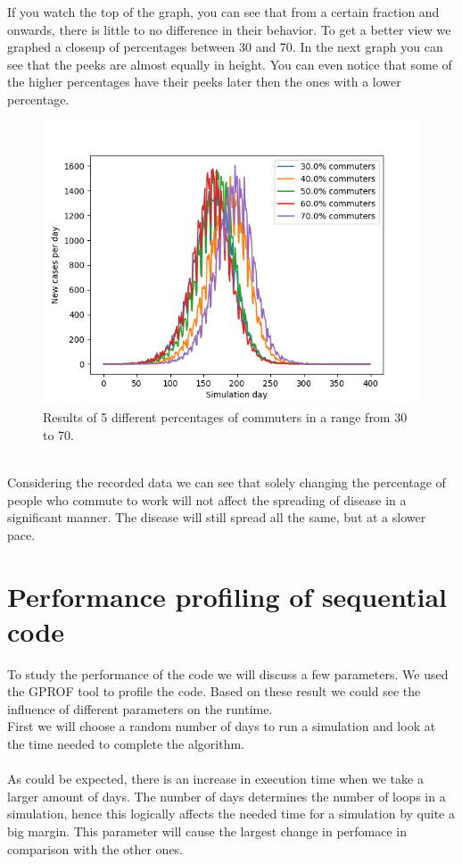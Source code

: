 \documentclass[runningheads]{llncs}
\begin{document}
If you watch the top of the graph, you can see that from a certain fraction and onwards, there is little to no difference in their behavior. To get a better view we graphed a closeup of percentages between 30 and 70. In the next graph you can see that the peeks are almost equally in height. You can even notice that some of the higher percentages have their peeks later then the ones with a lower percentage. 
\begin{figure}
	\includegraphics[width=\textwidth]{test_30-70.png}
	\caption{Results of 5 different percentages of commuters in a range from 30 to 70.}
\end{figure}
\\
Considering the recorded data we can see that solely changing the percentage of people who commute to work will not affect the spreading of disease in a significant manner. The disease will still spread all the same, but at a slower pace. 

\newpage
\section{Performance profiling of sequential code}
To study the performance of the code we will discuss a few parameters. We used the GPROF tool to profile the code. Based on these result we could see the influence of different parameters on the runtime.
\\
First we will choose a random number of days to run a simulation and look at the time needed to complete the algorithm. \\ 
\\
As could be expected, there is an increase in execution time when we take a larger amount of days. The number of days determines the number of loops in a simulation, hence this logically affects the needed time for a simulation by quite a big margin. This parameter will cause the largest change in perfomace in comparison with the other ones.
\end{document}
